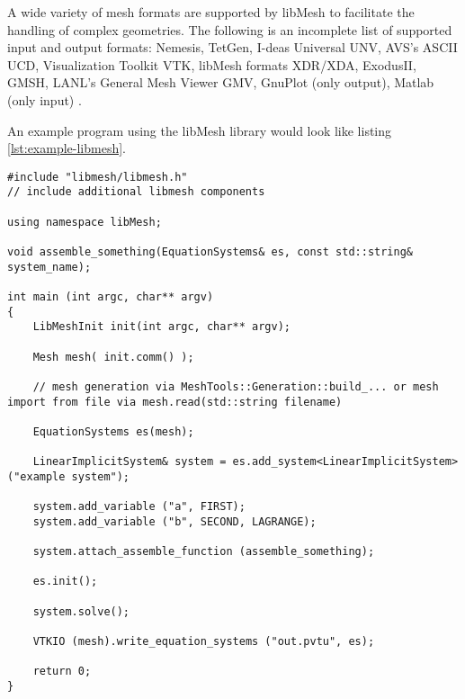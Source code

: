  A wide variety of mesh formats are supported by libMesh to facilitate the handling of complex geometries. The following is an incomplete list of supported input and output formats: Nemesis, TetGen, I-deas Universal UNV, AVS's ASCII UCD, Visualization Toolkit VTK, libMesh formats XDR/XDA, ExodusII, GMSH, LANL's General Mesh Viewer GMV, GnuPlot (only output), Matlab (only input) \cite{kirk2013case}.
 
 An example program using the libMesh library would look like listing \ref{lst:example-libmesh}.
 \begin{lstlisting}[caption=Example libMesh program,label=lst:example-libmesh]
#include "libmesh/libmesh.h"
// include additional libmesh components

using namespace libMesh;

void assemble_something(EquationSystems& es, const std::string& system_name);

int main (int argc, char** argv)
{
	LibMeshInit init(int argc, char** argv);
	
	Mesh mesh( init.comm() );
	
	// mesh generation via MeshTools::Generation::build_... or mesh import from file via mesh.read(std::string filename)
	
	EquationSystems es(mesh);
	
	LinearImplicitSystem& system = es.add_system<LinearImplicitSystem> ("example system");
	
	system.add_variable ("a", FIRST);
	system.add_variable ("b", SECOND, LAGRANGE);
	
	system.attach_assemble_function (assemble_something);

	es.init();
	
	system.solve();
	
	VTKIO (mesh).write_equation_systems ("out.pvtu", es);
	
	return 0;
}
 \end{lstlisting}

